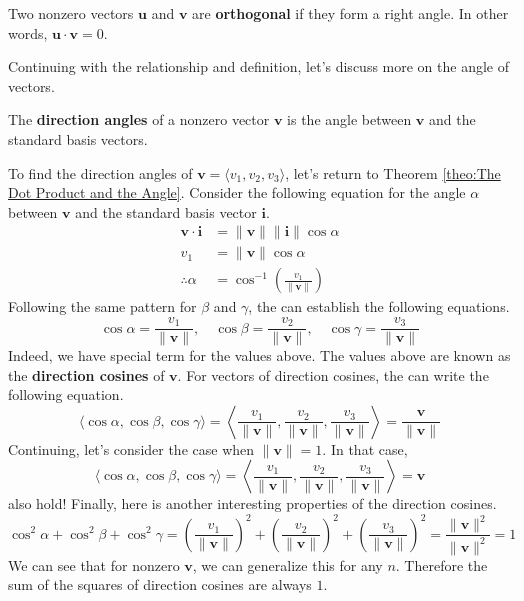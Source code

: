 \documentclass[../../main.tex]{subfiles}
\begin{document}
\begin{definition}{}{}
Two nonzero vectors $\mathbf{u}$ and $\mathbf{v}$ are
\textbf{orthogonal} if they form a right angle. In other words,
$\mathbf{u} \cdot \mathbf{v} = 0$.
\end{definition}

Continuing with the relationship and definition, let's discuss
more on the angle of vectors.

\begin{definition}{}{}
The \textbf{direction angles} of a nonzero vector $\mathbf{v}$ is
the angle between $\mathbf{v}$ and the standard basis vectors.
\end{definition}

To find the direction angles of $\mathbf{v} = \langle v_1, v_2, v_3
\rangle$, let's return to Theorem \ref{theo:The Dot Product and the
Angle}. Consider the following equation for the angle $\alpha$
between $\mathbf{v}$ and the standard basis vector $\mathbf{i}$.
\begin{align*}
    \mathbf{v} \cdot \mathbf{i}
    &= \| \mathbf{v} \| \| \mathbf{i} \| \cos\alpha \\
    v_1 &= \| \mathbf{v} \| \cos\alpha \\
    \therefore
    \alpha &= \cos^{-1} \left( \frac{v_1}{\| \mathbf{v} \|} \right)
\end{align*}
Following the same pattern for $\beta$ and $\gamma$, the can
establish the following equations.
\[
\cos\alpha = \frac{v_1}{\| \mathbf{v} \|}, \quad
\cos\beta = \frac{v_2}{\| \mathbf{v} \|}, \quad
\cos\gamma = \frac{v_3}{\| \mathbf{v} \|}
\]
Indeed, we have special term for the values above. The values above
are known as the \textbf{direction cosines} of $\mathbf{v}$. For
vectors of direction cosines, the can write the following equation.
\[
\langle \cos\alpha, \cos\beta, \cos\gamma \rangle
= \left\langle
    \frac{v_1}{\| \mathbf{v} \|},
    \frac{v_2}{\| \mathbf{v} \|},
    \frac{v_3}{\| \mathbf{v} \|}
\right\rangle
= \frac{\mathbf{v}}{\| \mathbf{v} \|}
\]
Continuing, let's consider the case when $\| \mathbf{v} \| = 1$.
In that case,
\[
\langle \cos\alpha, \cos\beta, \cos\gamma \rangle
= \left\langle
    \frac{v_1}{\| \mathbf{v} \|},
    \frac{v_2}{\| \mathbf{v} \|},
    \frac{v_3}{\| \mathbf{v} \|}
\right\rangle
= \mathbf{v}
\]
also hold! Finally, here is another interesting properties of the
direction cosines.
\[
\cos^2\alpha + \cos^2\beta + \cos^2\gamma
= \left( \frac{v_1}{\| \mathbf{v} \|} \right)^2
    + \left( \frac{v_2}{\| \mathbf{v} \|} \right)^2
    + \left( \frac{v_3}{\| \mathbf{v} \|} \right)^2
= \frac{\| \mathbf{v} \|^2}{\| \mathbf{v} \|^2}
= 1
\]
We can see that for nonzero $\mathbf{v}$, we can generalize this
for any $n$. Therefore the sum of the squares of direction cosines
are always $1$.
\end{document}
